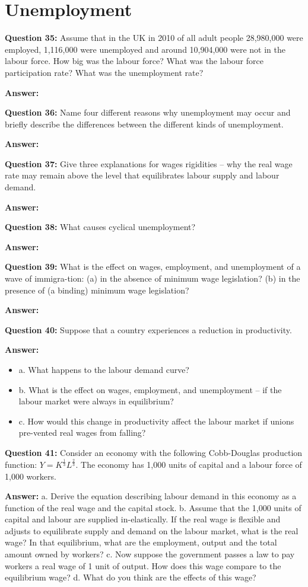 \documentclass[a4paper, 11pt]{article}
\begin{document}
\section{Unemployment}
\textbf{Question 35:} Assume that in the UK in 2010 of all adult people 28,980,000 were employed, 1,116,000 were unemployed and around 10,904,000 were not in the labour force. How big was the labour force? What was the labour force participation rate? What was the unemployment rate?

\textbf{Answer:}

\textbf{Question 36:} Name four different reasons why unemployment may occur and briefly describe the differences between the different kinds of unemployment.

\textbf{Answer:}

\textbf{Question 37:} Give three explanations for wages rigidities – why the real wage rate may remain above the level that equilibrates labour supply and labour demand.

\textbf{Answer:}

\textbf{Question 38:} What causes cyclical unemployment? 

\textbf{Answer:}

\textbf{Question 39:} What is the effect on wages, employment, and unemployment of a wave of immigra-tion: (a) in the absence of minimum wage legislation? (b) in the presence of (a binding) minimum wage legislation?

\textbf{Answer:}

\textbf{Question 40:} Suppose that a country experiences a reduction in productivity.

\textbf{Answer:}

\begin{itemize}
\item a. What happens to the labour demand curve?
\item b. What is the effect on wages, employment, and unemployment – if the labour market were always in equilibrium?
\item c. How would this change in productivity affect the labour market if unions pre-vented real wages from falling?
\end{itemize}

\textbf{Question 41:} Consider an economy with the following Cobb-Douglas production function: $Y = K^{\frac{1}{3}}L^{\frac{2}{3}}$. The economy has 1,000 units of capital and a labour force of 1,000 workers.

\textbf{Answer:}
a. Derive the equation describing labour demand in this economy as a function of the real wage and the capital stock.
b. Assume that the 1,000 units of capital and labour are supplied in-elastically. If the real wage is flexible and adjusts to equilibrate supply and demand on the labour market, what is the real wage? In that equilibrium, what are the employment, output and the total amount owned by workers?
c. Now suppose the government passes a law to pay workers a real wage of 1 unit of output. How does this wage compare to the equilibrium wage?
d. What do you think are the effects of this wage?
\end{document}
